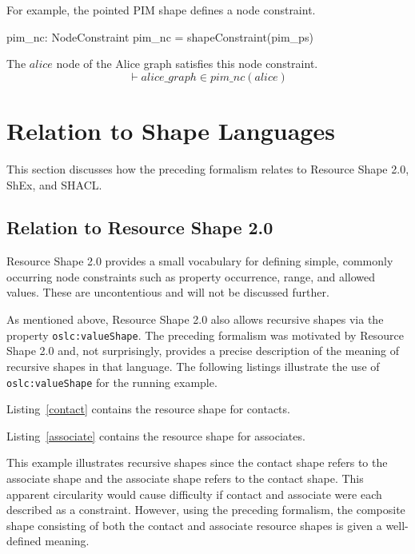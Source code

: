 \documentclass{article}
\begin{document}
For example, the pointed PIM shape defines a node constraint.
\begin{axdef}
	pim\_nc: NodeConstraint
\where
	pim\_nc = shapeConstraint(pim\_ps)
\end{axdef}

The $alice$ node of the Alice graph satisfies this node constraint.
\[\vdash
	alice\_graph \in pim\_nc(alice)
\]

\section{Relation to Shape Languages}
\label{sec-languages}

This section discusses how the preceding formalism relates to Resource Shape 2.0, ShEx, and SHACL.

\subsection{Relation to Resource Shape 2.0}

Resource Shape 2.0 provides a small vocabulary for defining simple, commonly occurring node constraints
such as property occurrence, range, and allowed values. These are uncontentious and will not be discussed further.

As mentioned above, Resource Shape 2.0 also allows recursive shapes via the property {\tt oslc:valueShape}.
The preceding formalism was motivated by Resource Shape 2.0 and, not surprisingly, provides a precise
description of the meaning of recursive shapes in that language.
The following listings illustrate the use of {\tt oslc:valueShape} for the running example.

Listing~\ref{contact} contains the resource shape for contacts.


Listing~\ref{associate} contains the resource shape for associates.


This example illustrates recursive shapes since the contact shape refers to the associate shape and the associate
shape refers to the contact shape. This apparent circularity would cause difficulty if contact and associate were
each described as a constraint. However, using the preceding formalism, the composite shape consisting of both the contact and
associate resource shapes is given a well-defined meaning.
\end{document}
